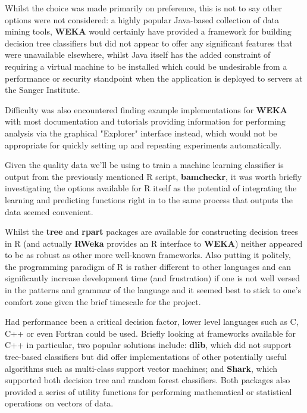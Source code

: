 Whilst the choice was made primarily on preference, this is not to say other
options were not considered: a highly popular Java-based collection of data
mining tools, \textbf{WEKA}\citep{weka} would certainly have provided a
framework for building decision tree classifiers but did not
appear to offer any significant features that were unavailable elsewhere, whilst
Java itself has the added constraint of requiring a virtual machine to be
installed which could be undesirable from a performance or security
standpoint when the application is deployed to servers at the Sanger Institute.


Difficulty was also encountered finding example implementations for \textbf{WEKA}
with most documentation and tutorials providing information for performing
analysis via the graphical "Explorer" interface instead, which would not be
appropriate for quickly setting up and repeating experiments automatically.

Given the quality data we'll be using to train a machine learning classifier is
output from the previously mentioned R script, \textbf{bamcheckr}, it was worth
briefly investigating the options available for R itself as the potential of
integrating the learning and predicting functions right in to the same process
that outputs the data seemed convenient.

Whilst the \textbf{tree}\citep{man:rtree} and \textbf{rpart}\citep{man:rpart}
packages are available for constructing decision trees in R (and actually
\textbf{RWeka} provides an R interface to \textbf{WEKA}) neither appeared to be
as robust as other more well-known frameworks. Also putting it politely, the
programming paradigm of R\citep{man:R} is rather different to other languages
and can significantly increase development time (and frustration\citep{argh}) if
one is not well versed in the patterns and grammar of the language  and it
seemed best to stick to one's comfort zone given the brief timescale for the
project.

Had performance been a critical decision factor, lower level languages such as
C, C++ or even Fortran could be used. Briefly looking at frameworks available
for C++ in particular, two popular solutions include: \textbf{dlib}\citep{dlib},
which did not support tree-based classifiers but did offer implementations of
other potentially useful algorithms such as multi-class support vector machines;
and \textbf{Shark}\citep{shark}, which supported both decision tree and random
forest classifiers. Both packages also provided a series of utility functions
for performing mathematical or statistical operations on vectors of data.


